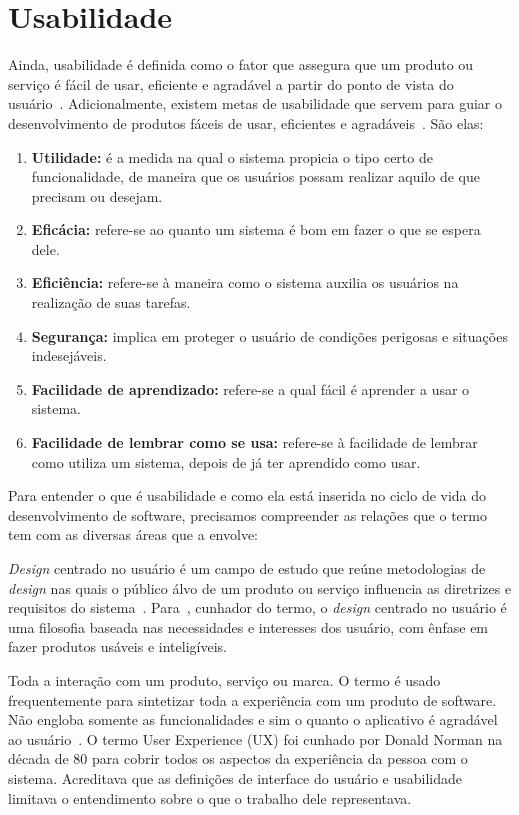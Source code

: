 \section{Usabilidade}
\label{sec:usabilidade}

Ainda, usabilidade é definida como o fator que assegura que um produto ou serviço é fácil de usar, eficiente e agradável a partir do ponto de vista do usuário~\cite{preece2007}.
Adicionalmente, existem metas de usabilidade que servem para guiar o desenvolvimento de produtos fáceis de usar, eficientes e agradáveis~\cite{preece2007}. São elas:

\begin{enumerate}
	\item \textbf{Utilidade:} é a medida na qual o sistema propicia o tipo certo de funcionalidade, de maneira que os usuários possam realizar aquilo de que precisam ou desejam.
	\item \textbf{Eficácia:} refere-se ao quanto um sistema é bom em fazer o que se espera dele.
	\item \textbf{Eficiência:} refere-se à maneira como o sistema auxilia os usuários na realização de suas tarefas.
	\item \textbf{Segurança:} implica em proteger o usuário de condições perigosas e situações indesejáveis.
	\item \textbf{Facilidade de aprendizado:} refere-se a qual fácil é aprender a usar o sistema.
	\item \textbf{Facilidade de lembrar como se usa:} refere-se à facilidade de lembrar como utiliza um sistema, depois de já ter aprendido como usar.
\end{enumerate}

Para entender o que é usabilidade e como ela está inserida no ciclo de vida do desenvolvimento de software, precisamos compreender as relações que o termo tem com as diversas áreas que a envolve: 

\emph{Design} centrado no usuário é um campo de estudo que reúne metodologias de \emph{design} nas quais o público álvo de um produto ou serviço influencia as diretrizes e requisitos do sistema~\cite{norman2006design}.
%
Para~\cite{norman2006design}, cunhador do termo, o \emph{design} centrado no usuário é uma filosofia baseada nas necessidades e interesses dos usuário, com ênfase em fazer produtos usáveis e inteligíveis.

Toda a interação com um produto, serviço ou marca. O termo é usado frequentemente para sintetizar toda a experiência com um produto de software. Não engloba  somente as funcionalidades e sim o quanto o aplicativo é  agradável ao usuário~\cite{travis2013}.
%	
O termo User Experience (UX) foi cunhado por Donald Norman na década de 80 para cobrir todos os aspectos da experiência da pessoa com o sistema. Acreditava que as definições de interface do usuário e usabilidade limitava o entendimento sobre o que o trabalho dele representava.

